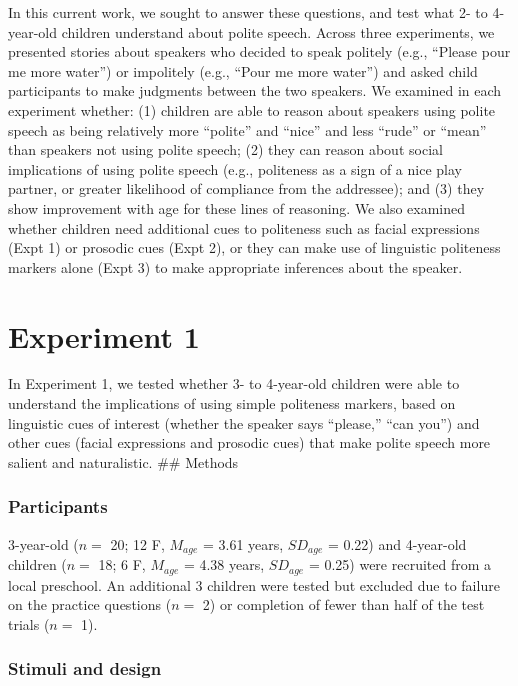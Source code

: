\documentclass[10pt, letterpaper]{article}
\begin{document}
In this current work, we sought to answer these questions, and test what
2- to 4-year-old children understand about polite speech. Across three
experiments, we presented stories about speakers who decided to speak
politely (e.g., ``Please pour me more water'') or impolitely (e.g.,
``Pour me more water'') and asked child participants to make judgments
between the two speakers. We examined in each experiment whether: (1)
children are able to reason about speakers using polite speech as being
relatively more ``polite'' and ``nice'' and less ``rude'' or ``mean''
than speakers not using polite speech; (2) they can reason about social
implications of using polite speech (e.g., politeness as a sign of a
nice play partner, or greater likelihood of compliance from the
addressee); and (3) they show improvement with age for these lines of
reasoning. We also examined whether children need additional cues to
politeness such as facial expressions (Expt 1) or prosodic cues (Expt
2), or they can make use of linguistic politeness markers alone (Expt 3)
to make appropriate inferences about the speaker.

\section{Experiment 1}\label{experiment-1}

In Experiment 1, we tested whether 3- to 4-year-old children were able
to understand the implications of using simple politeness markers, based
on linguistic cues of interest (whether the speaker says ``please,''
``can you'') and other cues (facial expressions and prosodic cues) that
make polite speech more salient and naturalistic. \#\# Methods

\subsubsection{Participants}\label{participants}

3-year-old (\(n=\) 20; 12 F, \(M_{age}\) = 3.61 years, \(SD_{age}\) =
0.22) and 4-year-old children (\(n=\) 18; 6 F, \(M_{age}\) = 4.38 years,
\(SD_{age}\) = 0.25) were recruited from a local preschool. An
additional 3 children were tested but excluded due to failure on the
practice questions (\(n=\) 2) or completion of fewer than half of the
test trials (\(n=\) 1).

\subsubsection{Stimuli and design}\label{stimuli-and-design}
\end{document}
